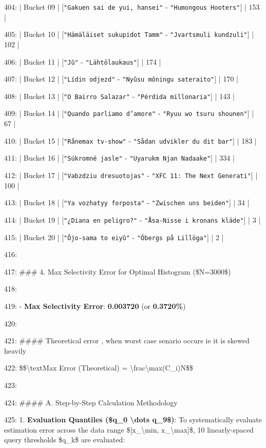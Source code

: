 \documentclass[11pt,a4paper]{article}
\begin{document}
404: | Bucket 09 | [\texttt{"Gakuen sai de yui, hansei"} - \texttt{"Humongous Hooters"}] | 153 |

405: | Bucket 10 | [\texttt{"Hämäläiset sukupidot Tamm"} - \texttt{"Jvartsmuli kundzuli"}] | 102 |

406: | Bucket 11 | [\texttt{"Jû"} - \texttt{"Lähtölaukaus"}] | 174 |

407: | Bucket 12 | [\texttt{"Lídin odjezd"} - \texttt{"Nyûsu môningu sateraito"}] | 170 |

408: | Bucket 13 | [\texttt{"O Bairro Salazar"} - \texttt{"Pérdida millonaria"}] | 143 |

409: | Bucket 14 | [\texttt{"Quando parliamo d'amore"} - \texttt{"Ryuu wo tsuru shounen"}] | 67 |

410: | Bucket 15 | [\texttt{"Rånemax tv-show"} - \texttt{"Sådan udvikler du dit bar"}] | 183 |

411: | Bucket 16 | [\texttt{"Súkromné jasle"} - \texttt{"Uyarukm Njan Nadaake"}] | 334 |

412: | Bucket 17 | [\texttt{"Vabzdziu dresuotojas"} - \texttt{"XFC 11: The Next Generati"}] | 100 |

413: | Bucket 18 | [\texttt{"Ya vozhatyy forposta"} - \texttt{"Zwischen uns beiden"}] | 34 |

414: | Bucket 19 | [\texttt{"¿Diana en peligro?"} - \texttt{"Åsa-Nisse i kronans kläde"}] | 3 |

415: | Bucket 20 | [\texttt{"Ôjo-sama to eiyû"} - \texttt{"Öbergs på Lillöga"}] | 2 |

416:

417: \#\#\# 4. Max Selectivity Error for Optimal Histogram (\$N=3000\$)

418:

419: - \textbf{Max Selectivity Error}: \textbf{0.003720} (or \textbf{0.3720\%})

420:

421: \#\#\#\# Theoretical error , when worst case senario occurs ie it is skewed heavily

422: \$\$\textbackslash{}text{Max Error (Theoretical)} = \textbackslash{}frac{\textbackslash{}max(C\_i)}{N}\$\$

423:

424: \#\#\#\# A. Step-by-Step Calculation Methodology

425: 1. \textbf{Evaluation Quantiles (\$q\_0 \textbackslash{}dots q\_9\$)}: To systematically evaluate estimation error across the data range \$[x\_{\textbackslash{}min}, x\_{\textbackslash{}max}]\$, 10 linearly-spaced query thresholds \$q\_k\$ are evaluated:
\end{document}
